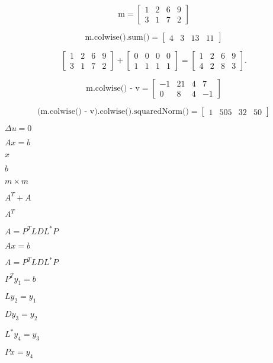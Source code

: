 \documentclass{article}
\begin{document}
\[
\mbox{m} = \begin{bmatrix} 1 & 2 & 6 & 9 \\
                    3 & 1 & 7 & 2 \end{bmatrix}
\]
\pagebreak

\[
\mbox{m.colwise().sum()} = \begin{bmatrix} 4 & 3 & 13 & 11 \end{bmatrix}
\]
\pagebreak

\[
\begin{bmatrix} 1 & 2 & 6 & 9 \\ 3 & 1 & 7 & 2 \end{bmatrix}
+ \begin{bmatrix} 0 & 0 & 0 & 0 \\ 1 & 1 & 1 & 1 \end{bmatrix}
= \begin{bmatrix} 1 & 2 & 6 & 9 \\ 4 & 2 & 8 & 3 \end{bmatrix}.
\]
\pagebreak

\[
  \mbox{m.colwise() - v} = 
  \begin{bmatrix}
    -1 & 21 & 4 & 7 \\
     0 & 8  & 4 & -1
  \end{bmatrix}
\]
\pagebreak

\[
  \mbox{(m.colwise() - v).colwise().squaredNorm()} =
  \begin{bmatrix}
     1 & 505 & 32 & 50
  \end{bmatrix}
\]
\pagebreak

$ \Delta u = 0 $
\pagebreak

$ Ax=b $
\pagebreak

$ x $
\pagebreak

$ b $
\pagebreak

$ m \times m $
\pagebreak

$ A^T + A $
\pagebreak

$ A^T $
\pagebreak

$ A =  P^TLDL^*P $
\pagebreak

$ A x = b $
\pagebreak

$ A = P^T L D L^* P $
\pagebreak

$ P^T y_1 = b $
\pagebreak

$ L y_2 = y_1 $
\pagebreak

$ D y_3 = y_2 $
\pagebreak

$ L^* y_4 = y_3 $
\pagebreak

$ P x = y_4 $
\pagebreak
\end{document}
